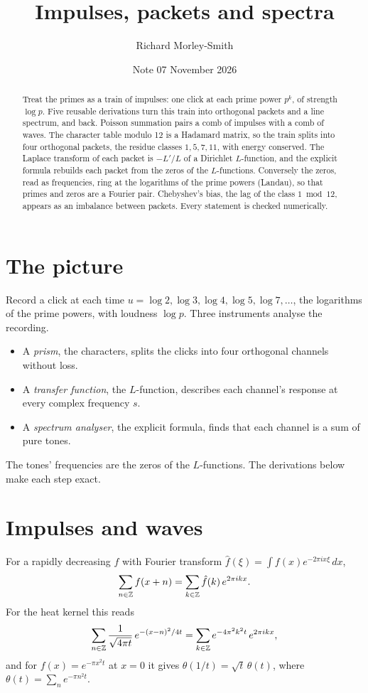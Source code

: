 \documentclass[11pt]{article}
\title{Impulses, packets and spectra}
\author{Richard Morley-Smith}
\date{Note 07 \quad November 2026}
\begin{document}
\maketitle

\begin{abstract}
\noindent
Treat the primes as a train of impulses: one click at each prime power $p^k$, of strength $\log p$.
Five reusable derivations turn this train into orthogonal packets and a line spectrum, and back.
Poisson summation pairs a comb of impulses with a comb of waves.
The character table modulo 12 is a Hadamard matrix, so the train splits into four orthogonal packets, the residue classes $1,5,7,11$, with energy conserved.
The Laplace transform of each packet is $-L'/L$ of a Dirichlet $L$-function, and the explicit formula rebuilds each packet from the zeros of the $L$-functions.
Conversely the zeros, read as frequencies, ring at the logarithms of the prime powers (Landau), so that primes and zeros are a Fourier pair.
Chebyshev's bias, the lag of the class $1 \bmod 12$, appears as an imbalance between packets.
Every statement is checked numerically.
\end{abstract}

\section{The picture}

Record a click at each time $u = \log 2, \log 3, \log 4, \log 5, \log 7,\dots$, the logarithms of the prime powers, with loudness $\log p$.
Three instruments analyse the recording.
\begin{itemize}
\item A \emph{prism}, the characters, splits the clicks into four orthogonal channels without loss.
\item A \emph{transfer function}, the $L$-function, describes each channel's response at every complex frequency $s$.
\item A \emph{spectrum analyser}, the explicit formula, finds that each channel is a sum of pure tones.
\end{itemize}
The tones' frequencies are the zeros of the $L$-functions.
The derivations below make each step exact.

\section{Impulses and waves}

\begin{derivation}\label{d:poisson}
For a rapidly decreasing $f$ with Fourier transform $\hat f(\xi) = \int f(x)e^{-2\pi i x\xi}\,dx$,
\[
  \sum_{n\in\mathbb{Z}} f(x+n) = \sum_{k\in\mathbb{Z}}\hat f(k)\,e^{2\pi i kx}.
\]
For the heat kernel this reads
\[
  \sum_{n\in\mathbb{Z}}\frac{1}{\sqrt{4\pi t}}\,e^{-(x-n)^2/4t} = \sum_{k\in\mathbb{Z}} e^{-4\pi^2k^2t}\,e^{2\pi i kx},
\]
and for $f(x) = e^{-\pi x^2 t}$ at $x=0$ it gives $\theta(1/t) = \sqrt t\,\theta(t)$, where $\theta(t) = \sum_n e^{-\pi n^2 t}$.
\end{derivation}
\end{document}
